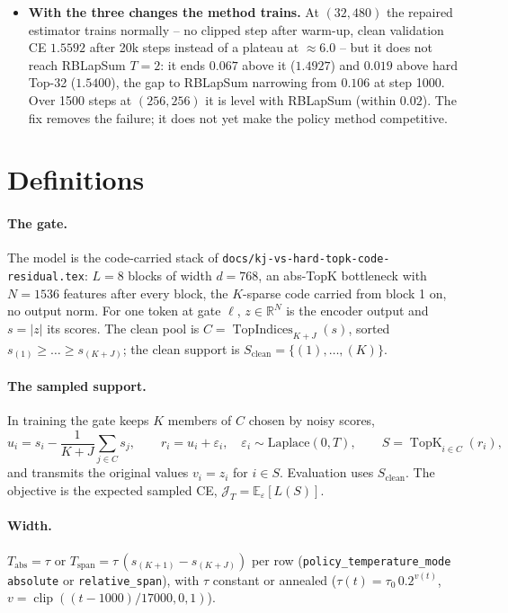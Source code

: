 \documentclass[11pt,a4paper]{article}
\newcommand{\code}[1]{\texttt{#1}}
\newcommand{\TopK}{\operatorname{TopK}}
\begin{document}
\begin{itemize}[leftmargin=1.4em]
\item \textbf{With the three changes the method trains.} At $(32, 480)$ the repaired
estimator trains normally -- no clipped step after warm-up, clean validation CE
$1.5592$ after 20k steps instead of a plateau at $\approx 6.0$ -- but it does not
reach RBLapSum $T = 2$: it ends $0.067$ above it ($1.4927$) and $0.019$ above hard
Top-32 ($1.5400$), the gap to RBLapSum narrowing from $0.106$ at step 1000. Over
1500 steps at $(256, 256)$ it is level with RBLapSum (within $0.02$). The fix
removes the failure; it does not yet make the policy method competitive.
\end{itemize}

\section{Definitions}

\paragraph{The gate.}
The model is the code-carried stack of \code{docs/kj-vs-hard-topk-code-residual.tex}:
$L = 8$ blocks of width $d = 768$, an abs-TopK bottleneck with $N = 1536$
features after every block, the $K$-sparse code carried from block 1 on, no
output norm. For one token at gate $\ell$, $z \in \mathbb{R}^N$ is the encoder
output and $s = |z|$ its scores. The clean pool is
$C = \operatorname{TopIndices}_{K+J}(s)$, sorted $s_{(1)} \ge \dots \ge s_{(K+J)}$;
the clean support is $S_{\mathrm{clean}} = \{(1), \dots, (K)\}$.

\paragraph{The sampled support.}
In training the gate keeps $K$ members of $C$ chosen by noisy scores,
\begin{equation}
u_i = s_i - \frac{1}{K+J}\sum_{j \in C} s_j, \qquad
r_i = u_i + \varepsilon_i, \quad \varepsilon_i \sim \mathrm{Laplace}(0, T), \qquad
S = \TopK_{i \in C}(r_i),
\label{eq:sample}
\end{equation}
and transmits the original values $v_i = z_i$ for $i \in S$. Evaluation uses
$S_{\mathrm{clean}}$. The objective is the expected sampled CE,
$\mathcal J_T = \mathbb E_\varepsilon[L(S)]$.

\paragraph{Width.}
$T_{\mathrm{abs}} = \tau$ or $T_{\mathrm{span}} = \tau\,(s_{(K+1)} - s_{(K+J)})$
per row (\code{policy\_temperature\_mode} \code{absolute} or
\code{relative\_span}), with $\tau$ constant or annealed
($\tau(t) = \tau_0\,0.2^{v(t)}$, $v = \operatorname{clip}((t-1000)/17000, 0, 1)$).
\end{document}
